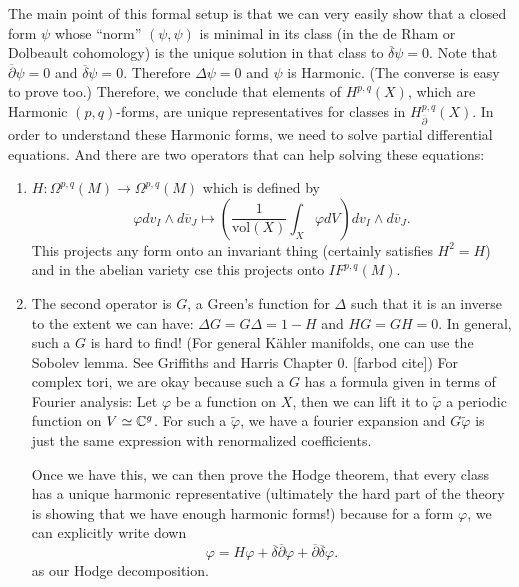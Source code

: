 The main point of this formal setup is that we can very easily show that a closed form $\psi$ whose ``norm'' $(\psi,\psi)$ is minimal in its class (in the de Rham or Dolbeault cohomology) is the unique solution in that class to $\overline{\delta}\psi=0$. Note that $\overline{\partial}\psi=0$ and $\overline{\delta}\psi=0$. Therefore $\Delta \psi=0$ and $\psi$ is Harmonic. (The converse is easy to prove too.) Therefore, we conclude that elements of $H^{p,q}(X)$, which are Harmonic $(p,q)$-forms, are unique representatives for classes in $H^{p,q}_{\overline{\partial}}(X)$. In order to understand these Harmonic forms, we need to solve partial differential equations. And there are two operators that can help solving these equations:
\begin{enumerate}
\item $H:\Omega^{p,q}(M)\to \Omega^{p,q}(M)$ which is defined by
$$\varphi dv_I\wedge d\overline{v}_J\mapsto \left(\frac{1}{\text{vol}(X)}\int_X \varphi dV\right)dv_I\wedge d\overline{v}_J.$$
This projects any form onto an invariant thing (certainly satisfies $H^2=H$) and in the abelian variety cse this projects onto $IF^{p,q}(M)$. 

\item The second operator is $G$, a Green's function for $\Delta$ such that it is an inverse to the extent we can have: $\Delta G=G\Delta = 1-H$ and $HG=GH=0$. In general, such a $G$ is hard to find! (For general K\"{a}hler manifolds, one can use the Sobolev lemma. See Griffiths and Harris Chapter $0$. [farbod cite]) For complex tori, we are okay because such a $G$ has a formula given in terms of Fourier analysis: Let $\varphi$ be a function on $X$, then we can lift it to $\tilde{\varphi}$ a periodic function on $V\simeq {\mathbb C}^g$. For such a $\tilde{\varphi}$, we have a fourier expansion and $G\tilde{\varphi}$ is just the same expression with renormalized coefficients. 

Once we have this, we can then prove the Hodge theorem, that every class has a unique harmonic representative (ultimately the hard part of the theory is showing that we have enough harmonic forms!) because for a form $\varphi$, we can explicitly write down
$$\varphi=H\varphi + \overline{\delta}\overline{\partial}\varphi+\overline{\partial}\overline{\delta}\varphi.$$ as our Hodge decomposition.
\end{enumerate}

